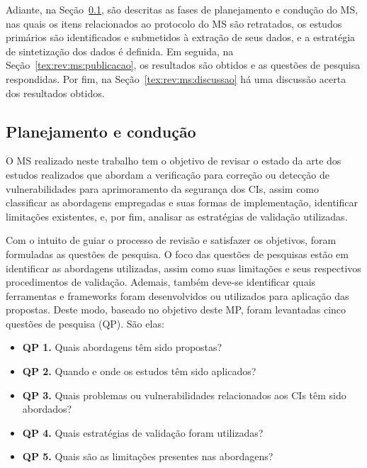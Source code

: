 Adiante, na Seção~\ref{tex:rev:ms:planejamento-cond}, são descritas as fases de planejamento e condução do MS, nas quais os itens relacionados ao protocolo do MS são retratados, os estudos primários são identificados e submetidos à extração de seus dados, e a estratégia de sintetização dos dados é definida. Em seguida, na Seção~\ref{tex:rev:ms:publicacao}, os resultados são obtidos e as questões de pesquisa respondidas. Por fim, na Seção~\ref{tex:rev:ms:discussao} há uma discussão acerta dos resultados obtidos.   

\subsection{Planejamento e condução}\label{tex:rev:ms:planejamento-cond}

O MS realizado neste trabalho tem o objetivo de revisar o estado da arte dos estudos realizados que abordam a verificação para correção ou detecção de vulnerabilidades para aprimoramento da segurança dos CIs, assim como classificar as abordagens empregadas e suas formas de implementação, identificar limitações existentes, e, por fim, analisar as estratégias de validação utilizadas.

Com o intuito de guiar o processo de revisão e satisfazer os objetivos, foram formuladas as questões de pesquisa. O foco das questões de pesquisas estão em identificar as abordagens utilizadas, assim como suas limitações e seus respectivos procedimentos de validação. Ademais, também deve-se identificar quais ferramentas e frameworks foram desenvolvidos ou utilizados para aplicação das propostas. Deste modo, baseado no objetivo deste MP, foram levantadas cinco questões de pesquisa (QP). São elas:

\begin{itemize}
    \item \textbf{QP 1.} Quais abordagens têm sido propostas?
    \item \textbf{QP 2.} Quando e onde os estudos têm sido aplicados?
    \item \textbf{QP 3.} Quais problemas ou vulnerabilidades relacionados aos CIs têm sido abordados?
    \item \textbf{QP 4.} Quais estratégias de validação foram utilizadas?
    \item \textbf{QP 5.} Quais são as limitações presentes nas abordagens?
\end{itemize}

